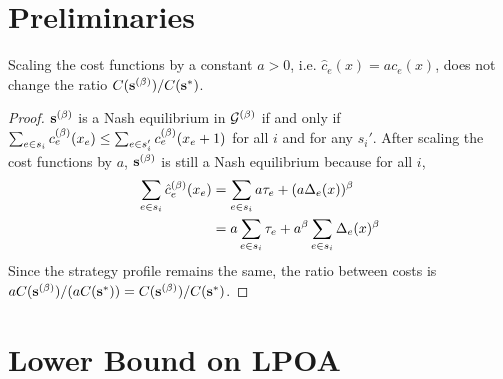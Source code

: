 \documentclass[twoside]{article}
\begin{document}
\begin{multicols}{2}
\section{Preliminaries}
\begin{lem} \label{lem:scale}
  Scaling the cost functions by a constant $a > 0$, i.e. $\hat c_e(x) = a
  c_e(x)$, does not change the ratio $C(\mathbf{s}^{(\beta)})/C(\mathbf{s}^*)$.
\end{lem}
\begin{proof}
  $\mathbf{s}^{(\beta)}$ is a Nash equilibrium in $\mathcal{G}^{(\beta)}$ if and only if $\sum_{e
  \in s_i} c_e^{(\beta)}(x_e) \le \sum_{e \in s_i'} c_e^{(\beta)}(x_e + 1)$ for all $i$
  and for any $s_i'$. After scaling the cost functions by $a$, $\mathbf{s}^{(\beta)}$ is
  still a Nash equilibrium because for all $i$,
  \begin{align*}
    \sum_{e \in s_i} \hat c_e^{(\beta)}(x_e) &= \sum_{e \in s_i} a\tau_e +
    (a\Delta_e(x))^\beta \\
    &= a \sum_{e \in s_i} \tau_e + a^\beta \sum_{e \in s_i} \Delta_e(x)^\beta
  \end{align*}
  Since the strategy profile remains the same, the ratio between costs is $a
  C(\mathbf{s}^{(\beta)})/(a C(\mathbf{s}^*)) = C(\mathbf{s}^{(\beta)})/C(\mathbf{s}^*)$.
\end{proof}
\section{Lower Bound on LPOA} \label{sec:lb}
\begin{figure}[H]
  \centering
  \begin{subfigure}[b]{\linewidth}
    \centering
\end{subfigure}
\end{figure}
\end{multicols}
\end{document}
